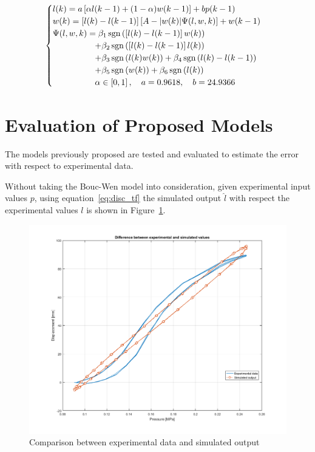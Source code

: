 \begin{equation}
	\begin{cases}
		l(k) = a \left [\alpha l(k-1) + (1-\alpha)w(k-1) \right] + bp(k-1) \\
		w(k) = \left[l(k)-l(k-1)\right]\left[A-\abs{w(k)}\Psi(l,w,k)\right]+w(k-1) \\
		\Psi(l,w,k) = \beta_1\operatorname{sgn}\left(\left[l(k)-l(k-1)\right]w(k)\right) \\
		\qquad \qquad \quad+\beta_2\operatorname{sgn}\left(\left[l(k)-l(k-1)\right]l(k)\right) \\
		\qquad \qquad \quad+\beta_3\operatorname{sgn}\left(l(k)w(k)\right) + \beta_4\operatorname{sgn}\left(l(k)-l(k-1)\right) \\
		\qquad \qquad \quad+\beta_5 \operatorname{sgn}\left(w(k)\right) + \beta_6 \operatorname{sgn}\left(l(k)\right) \\
		\qquad \qquad \quad \alpha \in \left[0,1\right],\quad a = 0.9618, \quad b=24.9366
	\end{cases}
	\label{eq:final_gen}
\end{equation}

\section{Evaluation of Proposed Models}
\label{sec:4.eva}

The models previously proposed are tested and evaluated to estimate
the error with respect to experimental data. 

Without taking the Bouc-Wen model into consideration, 
given experimental input values $p$, using equation~\ref{eq:disc_tf}
the simulated output $\hat{l}$ with respect the experimental values $l$
is shown in Figure~\ref{fig:comparison}.

\begin{figure}[H]
	\centering
	\includegraphics[width=\linewidth]{Images/comparison}
	\caption[Comparison between experimental data and simulated output]{Comparison between experimental data and simulated output}
	\label{fig:comparison}
\end{figure}

